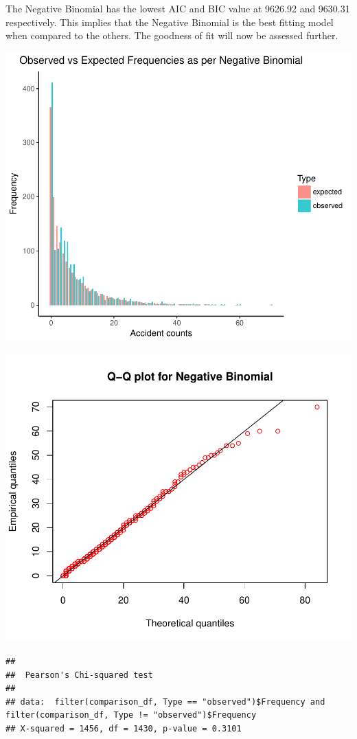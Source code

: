 \documentclass[11pt,preprint, authoryear]{elsarticle}
\numberwithin{equation}{section}
\numberwithin{figure}{section}
\numberwithin{table}{section}
\begin{document}
The Negative Binomial has the lowest AIC and BIC value at 9626.92 and
9630.31 respectively. This implies that the Negative Binomial is the
best fitting model when compared to the others. The goodness of fit will
now be assessed further.

\includegraphics{likelihood_files/figure-latex/best_model_fit-1.pdf}

\includegraphics{likelihood_files/figure-latex/qq_plot-1.pdf}

\begin{verbatim}
## 
##  Pearson's Chi-squared test
## 
## data:  filter(comparison_df, Type == "observed")$Frequency and filter(comparison_df, Type != "observed")$Frequency
## X-squared = 1456, df = 1430, p-value = 0.3101
\end{verbatim}
\end{document}
